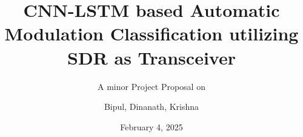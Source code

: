 \subtitle{A minor Project Proposal on }
\title[Real Time AMC]{CNN-LSTM based Automatic Modulation Classification utilizing SDR as Transceiver}
\author[Bipul, Dinanath, Krishna]{Bipul, Dinanath, Krishna}



\newcommand{\slideauthorI}{Bipul Kumar Dahal (THA078BEI009)}
\newcommand{\slideauthorII}{Dinanath Padhya (THA078BEI010)}
\newcommand{\slideauthorIII}{Krishna Acharya (THA078BEI020)}
\newcommand{\slideauthorall}{\slideauthorI, \\ \slideauthorII, \\ \slideauthorIII}
\newcommand{\supervisor}{Er. Dinesh Baniya Kshatri}



\date{February 4, 2025}


